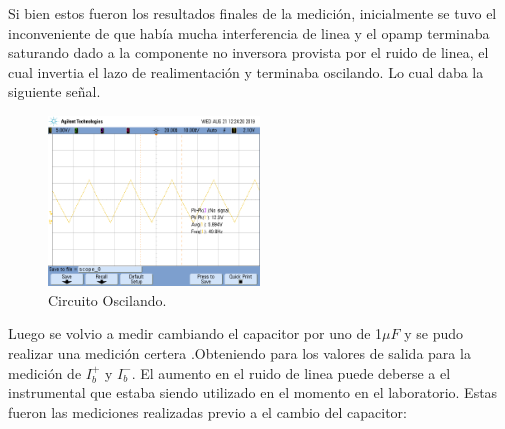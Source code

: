 Si bien estos fueron los resultados finales de la medición, inicialmente se tuvo el inconveniente de que había mucha interferencia de linea y el opamp terminaba saturando dado a la componente no inversora provista por el ruido de linea, el cual invertia el lazo de realimentación y terminaba oscilando.
Lo cual daba la siguiente señal.
\begin{figure}[H]	
	\centering
	\includegraphics[width=0.5\textwidth]{imagenes/opmpOscilando.png}
	\caption{Circuito Oscilando.}
	\label{fig:oscilando}
\end{figure}
Luego se volvio a medir cambiando el capacitor por uno de 1$\mu F$ 
y  se pudo realizar una medición certera .Obteniendo para los valores de salida para la medición de $I_b^+$ y $I_b^-$. El aumento en el ruido de linea puede deberse a el instrumental que estaba siendo utilizado en el momento en el laboratorio.
Estas fueron las mediciones realizadas previo a el cambio del capacitor:
